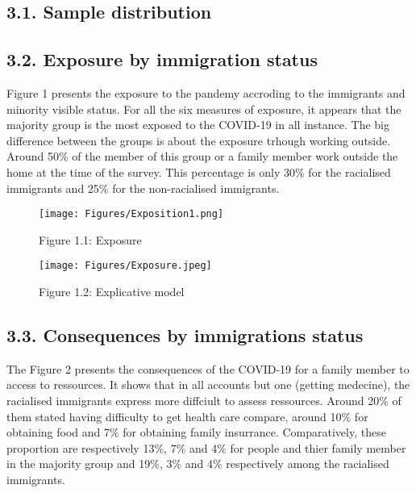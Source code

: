 \documentclass[
]{article}
\begin{document}
\hypertarget{sample-distribution-1}{%
\subsection{3.1. Sample distribution}\label{sample-distribution-1}}

\hypertarget{exposure-by-immigration-status-1}{%
\subsection{3.2. Exposure by immigration status}\label{exposure-by-immigration-status-1}}

Figure 1 presents the exposure to the pandemy accroding to the immigrants and
minority visible status. For all the six measures of exposure, it appears that
the majority group is the most exposed to the COVID-19 in all instance. The big
difference between the groups is about the exposure trhough working outside.
Around 50\% of the member of this group or a family member work outside the home
at the time of the survey. This percentage is only 30\% for the racialised
immigrants and 25\% for the non-racialised immigrants.

\begin{figure}
\centering
\texttt{[image: Figures/Exposition1.png]}
\caption{Figure 1.1: Exposure}
\end{figure}

\begin{figure}
\centering
\texttt{[image: Figures/Exposure.jpeg]}
\caption{Figure 1.2: Explicative model}
\end{figure}

\hypertarget{consequences-by-immigrations-status-1}{%
\subsection{3.3. Consequences by immigrations status}\label{consequences-by-immigrations-status-1}}

The Figure 2 presents the consequences of the COVID-19 for a family member to
access to ressources. It shows that in all accounts but one (getting medecine),
the racialised immigrants express more diffciult to assess ressources. Around
20\% of them stated having difficulty to get health care compare, around 10\% for
obtaining food and 7\% for obtaining family insurrance. Comparatively, these
proportion are respectively 13\%, 7\% and 4\% for people and thier family member in
the majority group and 19\%, 3\% and 4\% respectively among the racialised
immigrants.
\end{document}
